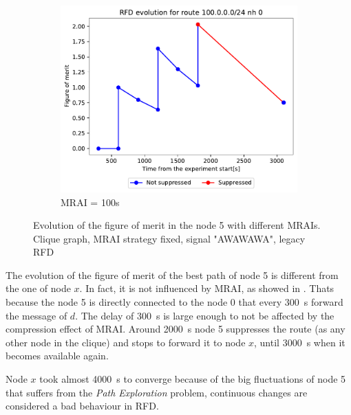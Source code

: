 \begin{figure}[h]
\begin{subfigure}[b]{0.49\textwidth}
         \label{fig:clique_5_mrai50}
     \end{subfigure}
     \hfill
     \begin{subfigure}[b]{0.49\textwidth}
         \centering
         \includegraphics[width=\textwidth]{images/RFD/clique/FigureOfMerit/mrai21_RFD_5_rfd_R1.pdf}
         \caption{MRAI = 100s}
         \label{fig:clique_5_mrai100}
     \end{subfigure}
		\caption{Evolution of the figure of merit in the node \num{5} with different MRAIs.
		Clique graph, MRAI strategy fixed, signal "AWAWAWA", legacy RFD}
        \label{fig:clique_node5}
\end{figure}

The evolution of the figure of merit of the best path of node \num{5} is different
from the one of node $x$.
In fact, it is not influenced by \ac{MRAI}, as showed in .
Thats because the node \num{5} is directly connected to the node \num{0} that every
\SI{300}{\second} forward the message of $d$. The delay of \SI{300}{\second} is large
enough to not be affected by the compression effect of \ac{MRAI}.
Around \SI{2000}{\second} node \num{5} suppresses the route (as any other node in the
clique) and stops to forward it to node $x$, until \SI{3000}{\second} when it becomes
available again.

Node $x$ took almost \SI{4000}{\second} to converge because of the big fluctuations
of node \num{5} that suffers from the \textit{Path Exploration} problem, continuous
changes are considered a bad behaviour in \ac{RFD}.

